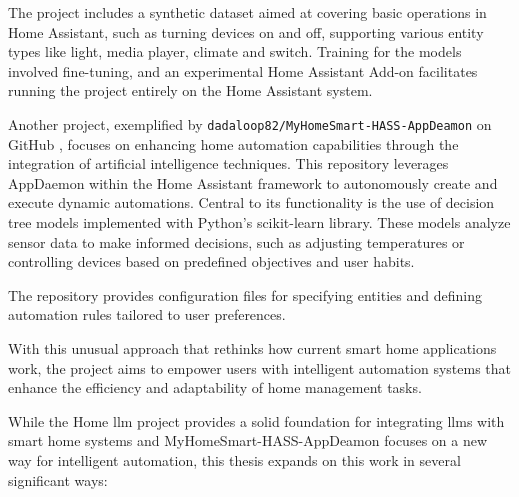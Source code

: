 The project includes a synthetic dataset aimed at covering basic operations in Home Assistant, such as turning devices on and off, supporting various entity types like light, media player, climate and switch. Training for the models involved fine-tuning, and an experimental Home Assistant Add-on facilitates running the project entirely on the Home Assistant system.

Another project, exemplified by \texttt{dadaloop82/MyHomeSmart-HASS-AppDeamon} on GitHub \cite{dadaloop82_MyHomeSmart_HASS_AppDeamon}, focuses on enhancing home automation capabilities through the integration of artificial intelligence techniques. This repository leverages AppDaemon within the Home Assistant framework to autonomously create and execute dynamic automations. Central to its functionality is the use of decision tree models implemented with Python's scikit-learn library. These models analyze sensor data to make informed decisions, such as adjusting temperatures or controlling devices based on predefined objectives and user habits.

The repository provides configuration files for specifying entities and defining automation rules tailored to user preferences.

With this unusual approach that rethinks how current smart home applications work, the project aims to empower users with intelligent automation systems that enhance the efficiency and adaptability of home management tasks.

While the Home \gls{llm} project provides a solid foundation for integrating \glspl{llm} with smart home systems and MyHomeSmart-HASS-AppDeamon focuses on a new way for intelligent automation, this thesis expands on this work in several significant ways:

